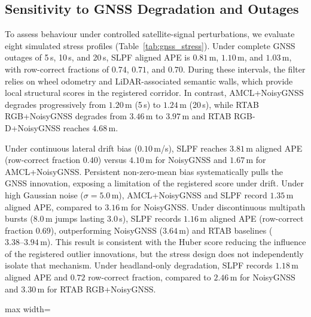 \documentclass[letterpaper, 10 pt, conference]{ieeeconf}
\begin{document}
\subsection{Sensitivity to GNSS Degradation and Outages}
To assess behaviour under controlled satellite-signal perturbations, we evaluate eight simulated stress profiles (Table~\ref{tab:gnss_stress}). Under complete GNSS outages of 5\,s, 10\,s, and 20\,s, SLPF aligned APE is $0.81\,$m, $1.10\,$m, and $1.03\,$m, with row-correct fractions of $0.74$, $0.71$, and $0.70$. During these intervals, the filter relies on wheel odometry and LiDAR-associated semantic walls, which provide local structural scores in the registered corridor. In contrast, AMCL+NoisyGNSS degrades progressively from $1.20\,$m (5\,s) to $1.24\,$m (20\,s), while RTAB RGB+NoisyGNSS degrades from $3.46\,$m to $3.97\,$m and RTAB RGB-D+NoisyGNSS reaches $4.68\,$m.

Under continuous lateral drift bias ($0.10\,$m/s), SLPF reaches $3.81\,$m aligned APE (row-correct fraction $0.40$) versus $4.10\,$m for NoisyGNSS and $1.67\,$m for AMCL+NoisyGNSS. Persistent non-zero-mean bias systematically pulls the GNSS innovation, exposing a limitation of the registered score under drift. Under high Gaussian noise ($\sigma = 5.0\,$m), AMCL+NoisyGNSS and SLPF record $1.35\,$m aligned APE, compared to $3.16\,$m for NoisyGNSS. Under discontinuous multipath bursts ($8.0\,$m jumps lasting $3.0\,$s), SLPF records $1.16\,$m aligned APE (row-correct fraction $0.69$), outperforming NoisyGNSS ($3.64\,$m) and RTAB baselines ($3.38\text{--}3.94\,$m). This result is consistent with the Huber score reducing the influence of the registered outlier innovations, but the stress design does not independently isolate that mechanism. Under headland-only degradation, SLPF records $1.18\,$m aligned APE and $0.72$ row-correct fraction, compared to $2.46\,$m for NoisyGNSS and $3.30\,$m for RTAB RGB+NoisyGNSS.

\begin{table}[t]
  \centering
  \caption{Component ablation study on traversal \texttt{rh\_run1} across seeds 11, 22, and 33. Metric $\Delta\text{APE}_{\text{align}}$ denotes difference relative to full SLPF.}
  \footnotesize
  \setlength{\tabcolsep}{2.5pt}
  \begin{adjustbox}{max width=\columnwidth}
    
  \end{adjustbox}
  \label{tab:ablation}
\end{table}
\end{document}
